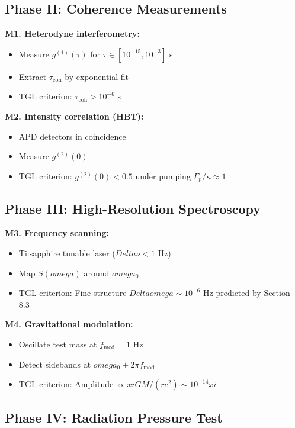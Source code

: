 \documentclass[12pt,a4paper]{article}
\def\xi{xi}%
\def\omega{omega}%
\def\Delta{Delta}%
\begin{document}
\subsection{Phase II: Coherence Measurements}

\textbf{M1. Heterodyne interferometry:}
\begin{itemize}
    \item Measure $g^{(1)}(\tau)$ for $\tau \in [10^{-15}, 10^{-3}]$ s
    \item Extract $\tau_{\text{coh}}$ by exponential fit
    \item TGL criterion: $\tau_{\text{coh}} > 10^{-6}$ s
\end{itemize}

\textbf{M2. Intensity correlation (HBT):}
\begin{itemize}
    \item APD detectors in coincidence
    \item Measure $g^{(2)}(0)$
    \item TGL criterion: $g^{(2)}(0) < 0.5$ under pumping $\Gamma_p/\kappa \approx 1$
\end{itemize}

\subsection{Phase III: High-Resolution Spectroscopy}

\textbf{M3. Frequency scanning:}
\begin{itemize}
    \item Ti:sapphire tunable laser ($\Delta\nu < 1$ Hz)
    \item Map $S(\omega)$ around $\omega_0$
    \item TGL criterion: Fine structure $\Delta\omega \sim 10^{-6}$ Hz predicted by Section 8.3
\end{itemize}

\textbf{M4. Gravitational modulation:}
\begin{itemize}
    \item Oscillate test mass at $f_{\text{mod}} = 1$ Hz
    \item Detect sidebands at $\omega_0 \pm 2\pi f_{\text{mod}}$
    \item TGL criterion: Amplitude $\propto \xi GM/(rc^2) \sim 10^{-14}\xi$
\end{itemize}

\subsection{Phase IV: Radiation Pressure Test}
\end{document}
